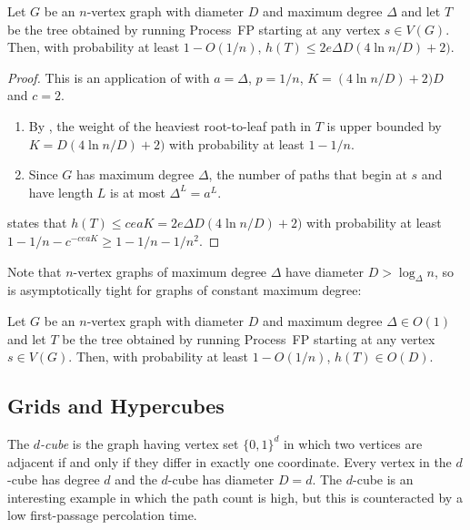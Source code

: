 \documentclass[lotsofwhite]{patmorin}
\begin{document}
\begin{thm}
  Let $G$ be an $n$-vertex graph with diameter $D$ and maximum degree $\Delta$
  and let $T$ be the tree obtained by running Process~FP starting at
  any vertex $s\in V(G)$.  Then, with probability at least $1-O(1/n)$,
  $h(T)\le 2e\Delta D(4\ln n/D)+2)$.
\end{thm}

\begin{proof}
  This is an application of  with $a=\Delta$, $p=1/n$,
  $K=(4\ln n/D)+2)D$ and $c=2$.
  \begin{enumerate}
     \item By , the weight of the heaviest
       root-to-leaf path in $T$ is upper bounded by $K=D(4\ln n/D)+2)$ 
       with probability
       at least $1-1/n$.
     \item Since $G$ has maximum degree $\Delta$, the number of paths
       that begin at $s$ and have length $L$ is at most $\Delta^L=a^L$.
  \end{enumerate}
   states that $h(T)\le ceaK = 2e\Delta D(4\ln n/D)+2)$ with probability at least $1-1/n-c^{-ceaK}\ge 1-1/n-1/n^2$.
\end{proof}

Note that $n$-vertex graphs of maximum degree $\Delta$ have diameter
$D>\log_\Delta n$, so  is asymptotically
tight for graphs of constant maximum degree:

\begin{cor}
  Let $G$ be an $n$-vertex graph with diameter $D$ and maximum degree
  $\Delta\in O(1)$ and let $T$ be the tree obtained by running Process~FP
  starting at any vertex $s\in V(G)$.  Then, with probability at least
  $1-O(1/n)$, $h(T)\in O(D)$.
\end{cor}

\subsection{Grids and Hypercubes}

The \emph{$d$-cube} is the graph having vertex set $\{0,1\}^d$ in
which two vertices are adjacent if and only if they differ in exactly
one coordinate.  Every vertex in the $d$-cube has degree $d$ and the
$d$-cube has diameter $D=d$.  The $d$-cube is an interesting example
in which the path count is high, but this is counteracted by a low
first-passage percolation time.
\end{document}
